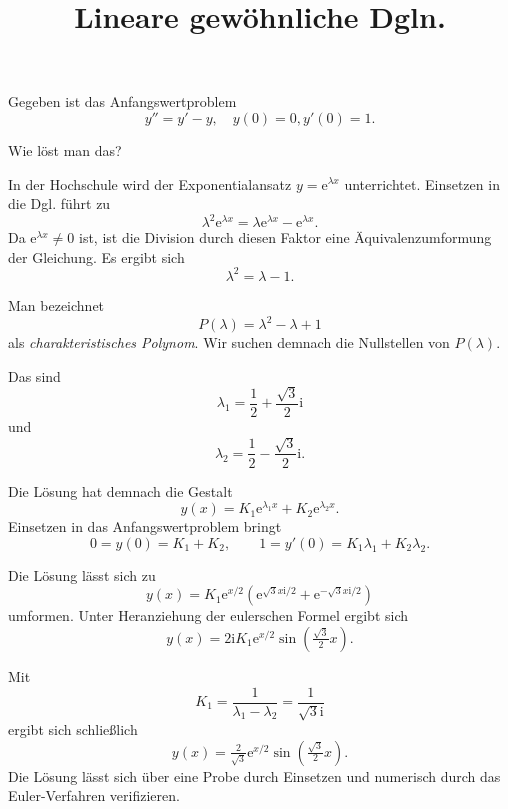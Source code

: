\documentclass{beamer}
\title{Lineare gewöhnliche Dgln.}
\date{}
\newcommand{\ee}{\mathrm e}
\newcommand{\ui}{\mathrm i}
\begin{document}
\maketitle

\begin{frame}
Gegeben ist das Anfangswertproblem
\[y'' = y'-y,\quad y(0)=0, y'(0)=1.\]
\end{frame}

\begin{frame}
Wie löst man das?
\end{frame}

\begin{frame}
In der Hochschule wird der Exponentialansatz $y=\ee^{\lambda x}$
unterrichtet. Einsetzen in die Dgl. führt zu
\[\lambda^2\ee^{\lambda x} = \lambda\ee^{\lambda x}-\ee^{\lambda x}.\]
Da $\ee^{\lambda x}\ne 0$ ist, ist die Division durch diesen Faktor
eine Äquivalenzumformung der Gleichung. Es ergibt sich
\[\lambda^2 = \lambda-1.\]
\end{frame}

\begin{frame}
Man bezeichnet
\[P(\lambda) = \lambda^2-\lambda+1\]
als \emph{charakteristisches Polynom}. Wir suchen demnach die
Nullstellen von $P(\lambda)$.
\end{frame}

\begin{frame}
Das sind
\[\lambda_1 = \frac{1}{2}+\frac{\sqrt{3}}{2}\ui\]
und
\[\lambda_2 = \frac{1}{2}-\frac{\sqrt{3}}{2}\ui.\]
\end{frame}

\begin{frame}
Die Lösung hat demnach die Gestalt
\[y(x) = K_1\ee^{\lambda_1 x}+K_2\ee^{\lambda_2 x}.\]
Einsetzen in das Anfangswertproblem bringt
\[0=y(0)=K_1+K_2,\qquad 1=y'(0)=K_1\lambda_1+K_2\lambda_2.\]
\end{frame}

\begin{frame}
Die Lösung lässt sich zu
\[y(x) = K_1\ee^{x/2}(\ee^{\sqrt{3}x\ui/2}+\ee^{-\sqrt{3}x\ui/2})\]
umformen. Unter Heranziehung der eulerschen Formel ergibt sich
\[y(x) = 2\ui K_1\ee^{x/2}\sin(\tfrac{\sqrt{3}}{2} x).\]
\end{frame}

\begin{frame}
Mit
\[K_1=\frac{1}{\lambda_1-\lambda_2} = \frac{1}{\sqrt{3}\ui}\]
ergibt sich schließlich
\[y(x) = \tfrac{2}{\sqrt{3}}\ee^{x/2}\sin(\tfrac{\sqrt{3}}{2} x).\]
Die Lösung lässt sich über eine Probe durch Einsetzen und numerisch
durch das Euler-Verfahren verifizieren.
\end{frame}
\end{document}
